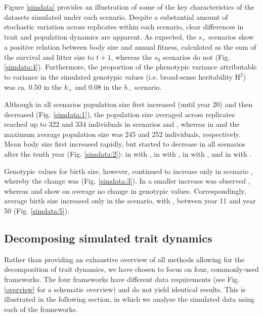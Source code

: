 Figure \ref{simdata} provides an illustration of some of the key characteristics of the datasets simulated under each scenario. Despite a substantial amount of stochastic variation across replicates within each scenario, clear differences in trait and population dynamics are apparent. As expected, the $s_+$ scenarios show a positive relation between body size and annual fitness, calculated as the sum of the survival and litter size to $t+1$, whereas the $s_0$ scenarios do not (Fig. \ref{simdata:4}). Furthermore, the proportion of the phenotypic variance attributable to variance in the simulated genotypic values (i.e. broad-sense heritability $\text{H}^2$) was ca. 0.50 in the $h_+$ and 0.08 in the $h_-$ scenario.

Although in all scenarios population size first increased (until year 20) and then decreased (Fig. \ref{simdata:1}), the  population size averaged across replicates reached up to 322 and 334 individuals in scenarios \Sh and \SH, whereas in \sh and \sH the maximum average population size was 245 and 252 individuals, respectively. Mean body size first increased rapidly, but started to decrease in all scenarios after the tenth year (Fig. \ref{simdata:2}): in \sh with , in \sH with , in \Sh with , and in \SH with .

Genotypic values for birth size, however, continued to increase only in scenario \SH, whereby the change was  (Fig. \ref{simdata:3}). In \Sh a smaller increase was observed , whereas \sh and \sH show on average no change in genotypic values. Correspondingly, average birth size increased only in the \SH scenario, with , between year 11 and year 50 (Fig. \ref{simdata:5}). 




\subsection{Decomposing simulated trait dynamics}
Rather than providing an exhaustive overview of all methods allowing for the decomposition of trait dynamics, we have chosen to focus on four, commonly-used frameworks. The four frameworks have different data requirements (see Fig. \ref{overview} for a schematic overview) and do not yield identical results. This is illustrated in the following section, in which we analyse the simulated data using each of the frameworks.

